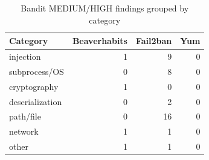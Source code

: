 \begin{table}[htbp]
\centering
\begin{tabular}{lrrr}
\hline
Category & Beaverhabits & Fail2ban & Yum \\
\hline
injection & 1 & 9 & 0 \\
subprocess/OS & 0 & 8 & 0 \\
cryptography & 1 & 0 & 0 \\
deserialization & 0 & 2 & 0 \\
path/file & 0 & 16 & 0 \\
network & 1 & 1 & 0 \\
other & 1 & 1 & 0 \\
\hline
\end{tabular}
\caption{Bandit MEDIUM/HIGH findings grouped by category}
\label{tab:bandit_mh_categories}
\end{table}
